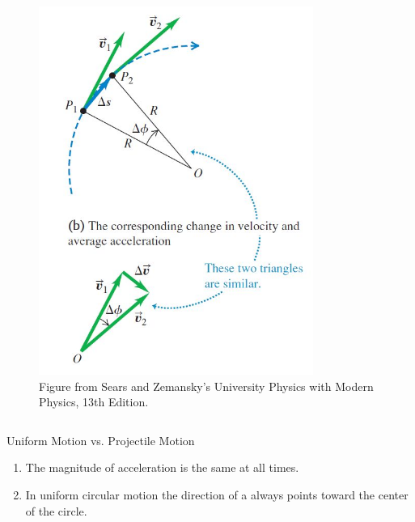 \documentclass[]{beamer}
\begin{document}
\begin{frame}
\begin{columns}[c]
   
         \begin{figure}[h!]  
             \includegraphics[width=0.8\textwidth]{images/27.jpg}
             \caption{ {\tiny Figure from Sears and Zemansky's University Physics 
             with Modern Physics, 13th Edition.} }
           \end{figure}
           
           
           
            
      
         \end{columns}
 
     
       \end{frame}





\begin{frame}

    Uniform Motion vs. Projectile Motion

            
   

         \begin{enumerate}
            \item The magnitude of acceleration is the same at all times.
            \item In uniform circular motion the direction of a  always points
            toward the center of the circle.
        \end{enumerate}
          

     
       \end{frame}
\end{document}
